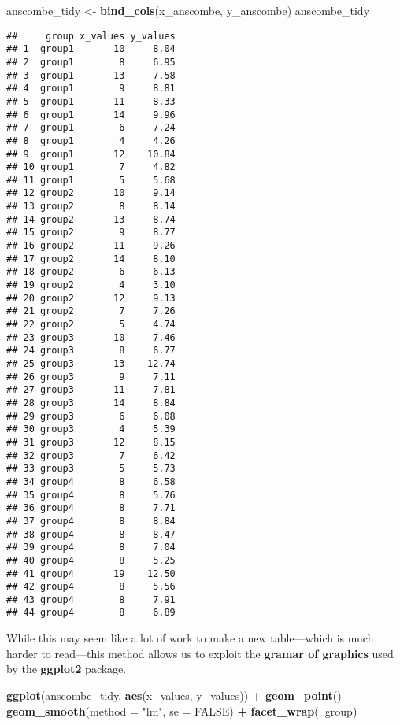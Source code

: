 \documentclass[]{book}
\newenvironment{Shaded}{\begin{snugshade}}{\end{snugshade}}
\newcommand{\DataTypeTok}[1]{\textcolor[rgb]{0.13,0.29,0.53}{#1}}
\newcommand{\KeywordTok}[1]{\textcolor[rgb]{0.13,0.29,0.53}{\textbf{#1}}}
\newcommand{\NormalTok}[1]{#1}
\newcommand{\OperatorTok}[1]{\textcolor[rgb]{0.81,0.36,0.00}{\textbf{#1}}}
\newcommand{\OtherTok}[1]{\textcolor[rgb]{0.56,0.35,0.01}{#1}}
\newcommand{\StringTok}[1]{\textcolor[rgb]{0.31,0.60,0.02}{#1}}
\theoremstyle{definition}
\theoremstyle{definition}
\theoremstyle{definition}
\theoremstyle{remark}
\begin{document}
\begin{Shaded}
\begin{Highlighting}[]
\NormalTok{anscombe_tidy <-}\StringTok{ }\KeywordTok{bind_cols}\NormalTok{(x_anscombe, y_anscombe)}
\NormalTok{anscombe_tidy}
\end{Highlighting}
\end{Shaded}

\begin{verbatim}
##     group x_values y_values
## 1  group1       10     8.04
## 2  group1        8     6.95
## 3  group1       13     7.58
## 4  group1        9     8.81
## 5  group1       11     8.33
## 6  group1       14     9.96
## 7  group1        6     7.24
## 8  group1        4     4.26
## 9  group1       12    10.84
## 10 group1        7     4.82
## 11 group1        5     5.68
## 12 group2       10     9.14
## 13 group2        8     8.14
## 14 group2       13     8.74
## 15 group2        9     8.77
## 16 group2       11     9.26
## 17 group2       14     8.10
## 18 group2        6     6.13
## 19 group2        4     3.10
## 20 group2       12     9.13
## 21 group2        7     7.26
## 22 group2        5     4.74
## 23 group3       10     7.46
## 24 group3        8     6.77
## 25 group3       13    12.74
## 26 group3        9     7.11
## 27 group3       11     7.81
## 28 group3       14     8.84
## 29 group3        6     6.08
## 30 group3        4     5.39
## 31 group3       12     8.15
## 32 group3        7     6.42
## 33 group3        5     5.73
## 34 group4        8     6.58
## 35 group4        8     5.76
## 36 group4        8     7.71
## 37 group4        8     8.84
## 38 group4        8     8.47
## 39 group4        8     7.04
## 40 group4        8     5.25
## 41 group4       19    12.50
## 42 group4        8     5.56
## 43 group4        8     7.91
## 44 group4        8     6.89
\end{verbatim}

While this may seem like a lot of work to make a new table---which is
much harder to read---this method allows us to exploit the
\textbf{gramar of graphics} used by the \textbf{ggplot2} package.

\begin{Shaded}
\begin{Highlighting}[]
\KeywordTok{ggplot}\NormalTok{(anscombe_tidy, }\KeywordTok{aes}\NormalTok{(x_values, y_values)) }\OperatorTok{+}
\StringTok{  }\KeywordTok{geom_point}\NormalTok{() }\OperatorTok{+}
\StringTok{  }\KeywordTok{geom_smooth}\NormalTok{(}\DataTypeTok{method =} \StringTok{"lm"}\NormalTok{, }\DataTypeTok{se =} \OtherTok{FALSE}\NormalTok{) }\OperatorTok{+}
\StringTok{  }\KeywordTok{facet_wrap}\NormalTok{(}\OperatorTok{~}\NormalTok{group)}
\end{Highlighting}
\end{Shaded}
\end{document}
